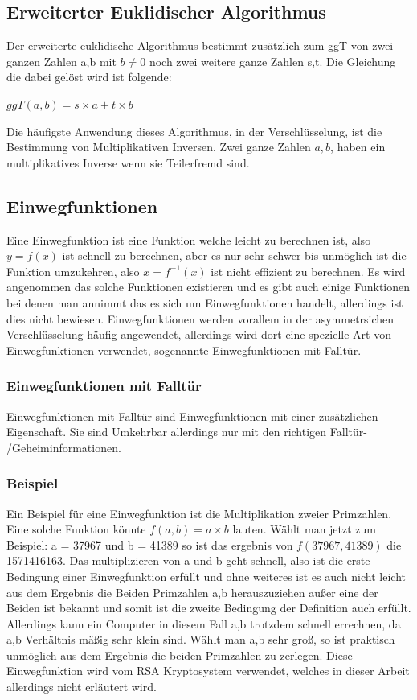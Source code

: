 \documentclass[a4paper,12pt,titlepage]{article}
\begin{document}
\subsection{Erweiterter Euklidischer Algorithmus}
Der erweiterte euklidische Algorithmus bestimmt zusätzlich zum ggT von zwei ganzen Zahlen a,b mit $b \neq 0$ noch zwei weitere ganze Zahlen s,t. Die Gleichung die dabei gelöst wird ist folgende: \newline

\begin{center}
$ggT(a,b) = s \times a + t \times b$
\end{center}
Die häufigste Anwendung dieses Algorithmus, in der Verschlüsselung, ist die Bestimmung von Multiplikativen Inversen. Zwei ganze Zahlen $a, b$, haben ein multiplikatives Inverse wenn sie Teilerfremd sind.

\subsection{Einwegfunktionen}
Eine Einwegfunktion ist eine Funktion welche leicht zu berechnen ist, also $y = f(x)$ ist schnell zu  berechnen, aber es nur sehr schwer bis unmöglich ist die Funktion umzukehren, also $x = f^{-1}(x)$ ist nicht effizient zu berechnen. Es wird angenommen das solche Funktionen existieren und es gibt auch einige Funktionen bei denen man annimmt das es sich um Einwegfunktionen handelt, allerdings ist dies nicht bewiesen. Einwegfunktionen werden vorallem in der asymmetrsichen Verschlüsselung häufig angewendet, allerdings wird dort eine spezielle Art von Einwegfunktionen verwendet, sogenannte Einwegfunktionen mit Falltür.

\subsubsection{Einwegfunktionen mit Falltür} \label{oneway_trapdoor}
Einwegfunktionen mit Falltür sind Einwegfunktionen mit einer zusätzlichen Eigenschaft. Sie sind Umkehrbar allerdings nur mit den richtigen Falltür- /Geheiminformationen.

\subsubsection{Beispiel}
Ein Beispiel für eine Einwegfunktion ist die Multiplikation zweier Primzahlen.
Eine solche Funktion könnte $f(a,b) = a \times b$ lauten. \newline Wählt man jetzt zum Beispiel: a = 37967 und b = 41389 so ist das ergebnis von $f(37967, 41389)$ die 1571416163. Das multiplizieren von a und b geht schnell, also ist die erste Bedingung einer Einwegfunktion erfüllt und ohne weiteres ist es auch nicht leicht aus dem Ergebnis die Beiden Primzahlen a,b herauszuziehen außer eine der Beiden ist bekannt und somit ist die zweite Bedingung der Definition auch erfüllt. Allerdings kann ein Computer in diesem Fall a,b trotzdem schnell errechnen, da a,b Verhältnis mäßig sehr klein sind. Wählt man a,b sehr groß, so ist praktisch unmöglich aus dem Ergebnis die beiden Primzahlen zu zerlegen. Diese Einwegfunktion wird vom RSA Kryptosystem verwendet, welches in dieser Arbeit allerdings nicht erläutert wird.
\end{document}
